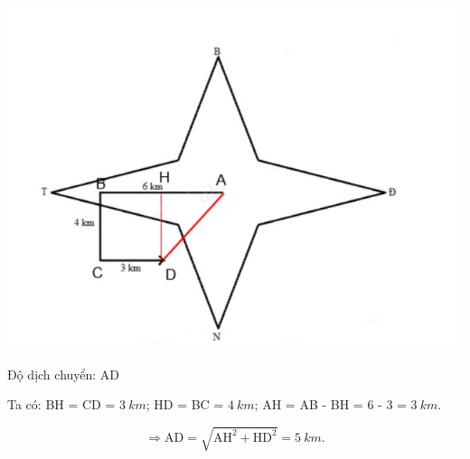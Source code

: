 \begin{enumerate}[label=\bfseries Câu \arabic*:]
{	\begin{center}
	\includegraphics[scale=0.6]{../figs/VN10-2022-PH-TP0001-1.jpg}
	\end{center}	

		Độ dịch chuyển: AD
		
		Ta có: BH = CD = $\SI{3}{km}$; HD = BC = $\SI{4}{km}$; AH = AB - BH = 6 - 3 = $\SI{3}{km}$.
		
		$$\Rightarrow \text{AD} = \sqrt{\text{AH}^2 + \text{HD}^2} = \SI{5}{km}.$$
		
	
	}
	
	
\end{enumerate}